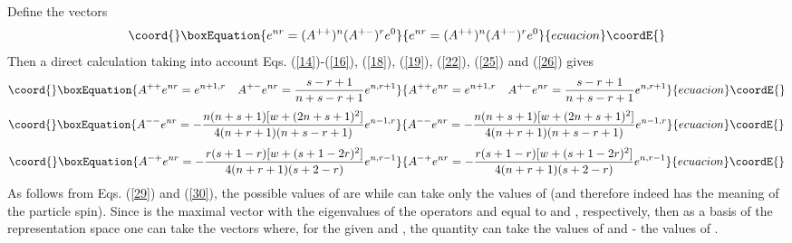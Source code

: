 \documentclass[a4paper,12pt]{article}%
\begin{document}
Define the vectors
\begin{equation}\coord{}\boxEquation{
e^{nr}=(A^{++})^n(A^{+-})^re^0
\label{27}
}{
e^{nr}=(A^{++})^n(A^{+-})^re^0
}{ecuacion}\coordE{}\end{equation}
Then a direct calculation taking into account Eqs.
(\ref{14})-(\ref{16}), (\ref{18}), (\ref{19}), (\ref{22}), 
(\ref{25}) and (\ref{26}) gives
\begin{equation}\coord{}\boxEquation{
A^{++}e^{nr}=e^{n+1,r}\quad A^{+-}e^{nr}=
\frac{s-r+1}{n+s-r+1}e^{n,r+1}
\label{28}
}{
A^{++}e^{nr}=e^{n+1,r}\quad A^{+-}e^{nr}=
\frac{s-r+1}{n+s-r+1}e^{n,r+1}
}{ecuacion}\coordE{}\end{equation}
\begin{equation}\coord{}\boxEquation{
A^{--}e^{nr}=-\frac{n(n+s+1)[w+(2n+s+1)^2]}
{4(n+r+1)(n+s-r+1)}e^{n-1,r}
\label{29}
}{
A^{--}e^{nr}=-\frac{n(n+s+1)[w+(2n+s+1)^2]}
{4(n+r+1)(n+s-r+1)}e^{n-1,r}
}{ecuacion}\coordE{}\end{equation}
\begin{equation}\coord{}\boxEquation{
A^{-+}e^{nr}=-\frac{r(s+1-r)[w+(s+1-2r)^2]}
{4(n+r+1)(s+2-r)}e^{n,r-1}
\label{30}
}{
A^{-+}e^{nr}=-\frac{r(s+1-r)[w+(s+1-2r)^2]}
{4(n+r+1)(s+2-r)}e^{n,r-1}
}{ecuacion}\coordE{}\end{equation}
As follows from Eqs. (\ref{29}) and (\ref{30}), 
the possible values of \coordHE{} are \coordHE{} while 
\coordHE{} can take only the values of \coordHE{}
(and therefore \coordHE{} indeed has the meaning of the 
particle spin). 
Since \coordHE{} is the maximal \coordHE{} vector with the
eigenvalues of the operators \coordHE{} and \coordHE{} equal to
\coordHE{} and \coordHE{}, respectively, then
as a basis of the representation space one can take the vectors
\coordHE{}
where, for the given \coordHE{} and \coordHE{}, the quantity \coordHE{} can
take the values of \coordHE{} and \coordHE{} - the values 
of \coordHE{}. 
\end{document}
